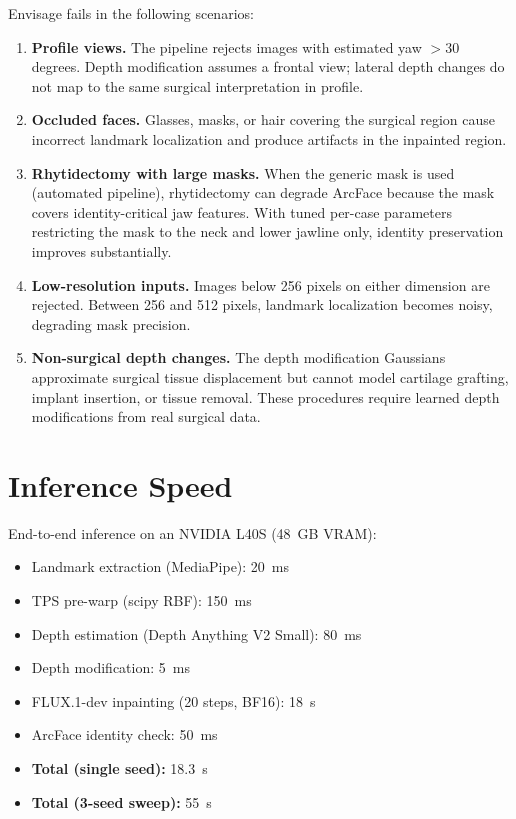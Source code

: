\documentclass[10pt,twocolumn,letterpaper]{article}
\newcommand{\method}{Envisage}
\begin{document}
\method{} fails in the following scenarios:
\begin{enumerate}
  \item \textbf{Profile views.} The pipeline rejects images with
    estimated yaw $> 30$ degrees. Depth modification assumes a frontal
    view; lateral depth changes do not map to the same surgical
    interpretation in profile.
  \item \textbf{Occluded faces.} Glasses, masks, or hair covering the
    surgical region cause incorrect landmark localization and produce
    artifacts in the inpainted region.
  \item \textbf{Rhytidectomy with large masks.} When the generic mask
    is used (automated pipeline), rhytidectomy can degrade ArcFace
    because the mask covers identity-critical jaw features. With tuned
    per-case parameters restricting the mask to the neck and lower
    jawline only, identity preservation improves substantially.
  \item \textbf{Low-resolution inputs.} Images below 256 pixels on
    either dimension are rejected. Between 256 and 512 pixels, landmark
    localization becomes noisy, degrading mask precision.
  \item \textbf{Non-surgical depth changes.} The depth modification
    Gaussians approximate surgical tissue displacement but cannot model
    cartilage grafting, implant insertion, or tissue removal. These
    procedures require learned depth modifications from real surgical
    data.
\end{enumerate}

\section{Inference Speed}

End-to-end inference on an NVIDIA L40S (48~GB VRAM):

\begin{itemize}
  \item Landmark extraction (MediaPipe): 20~ms
  \item TPS pre-warp (scipy RBF): 150~ms
  \item Depth estimation (Depth Anything V2 Small): 80~ms
  \item Depth modification: 5~ms
  \item FLUX.1-dev inpainting (20 steps, BF16): 18~s
  \item ArcFace identity check: 50~ms
  \item \textbf{Total (single seed):} 18.3~s
  \item \textbf{Total (3-seed sweep):} 55~s
\end{itemize}
\end{document}
